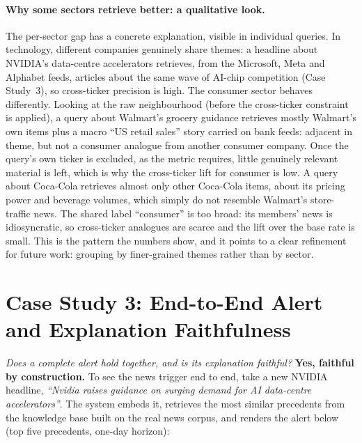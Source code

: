 \paragraph{Why some sectors retrieve better: a qualitative look.}
The per-sector gap has a concrete explanation, visible in individual queries. In technology, different
companies genuinely share themes: a headline about NVIDIA's data-centre accelerators retrieves, from the
Microsoft, Meta and Alphabet feeds, articles about the same wave of AI-chip competition (Case Study~3),
so cross-ticker precision is high. The consumer sector behaves differently. Looking at the raw
neighbourhood (before the cross-ticker constraint is applied), a query about Walmart's grocery guidance
retrieves mostly Walmart's own items plus a macro ``US retail sales'' story carried on bank feeds:
adjacent in theme, but not a consumer analogue from another consumer company. Once the query's own ticker
is excluded, as the metric requires, little genuinely relevant material is left, which is why the
cross-ticker lift for consumer is low. A query about Coca-Cola retrieves almost only other Coca-Cola items, about its pricing power and
beverage volumes, which simply do not resemble Walmart's store-traffic news. The shared label
``consumer'' is too broad: its members' news is idiosyncratic, so cross-ticker analogues are scarce and
the lift over the base rate is small. This is the pattern the numbers show, and it points to a clear
refinement for future work: grouping by finer-grained themes rather than by sector.

\section{Case Study 3: End-to-End Alert and Explanation Faithfulness}
\label{sec:cs_endtoend}

\emph{Does a complete alert hold together, and is its explanation faithful?} \textbf{Yes, faithful by
construction.} To see the news trigger end to end, take a new NVIDIA headline, \emph{``Nvidia raises
guidance on surging demand for AI data-centre accelerators''}. The system embeds it, retrieves the most
similar precedents from the knowledge base built on the real news corpus, and renders the alert below
(top five precedents, one-day horizon):

